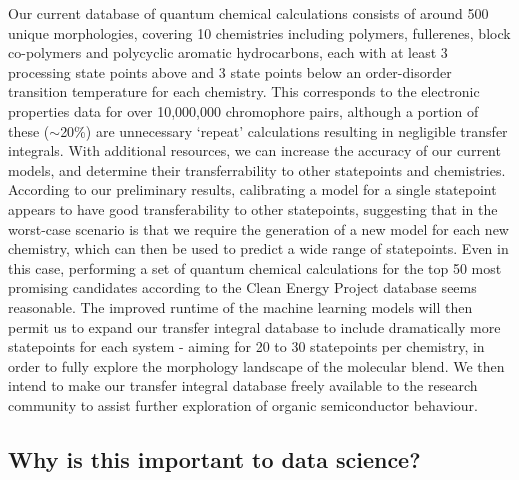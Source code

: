 \documentclass[12pt]{article}
\begin{document}
Our current database of quantum chemical calculations consists of around 500 unique morphologies, covering 10 chemistries including polymers, fullerenes, block co-polymers and polycyclic aromatic hydrocarbons, each with at least 3 processing state points above and 3 state points below an order-disorder transition temperature for each chemistry.
This corresponds to the electronic properties data for over 10,000,000 chromophore pairs, although a portion of these ($\sim$20\%) are unnecessary `repeat' calculations resulting in negligible transfer integrals.
With additional resources, we can increase the accuracy of our current models, and determine their transferrability to other statepoints and chemistries.
According to our preliminary results, calibrating a model for a single statepoint appears to have good transferability to other statepoints, suggesting that in the worst-case scenario is that we require the generation of a new model for each new chemistry, which can then be used to predict a wide range of statepoints.
Even in this case, performing a set of quantum chemical calculations for the top 50 most promising candidates according to the Clean Energy Project database seems reasonable.
The improved runtime of the machine learning models will then permit us to expand our transfer integral database to include dramatically more statepoints for each system - aiming for 20 to 30 statepoints per chemistry, in order to fully explore the morphology landscape of the molecular blend.
We then intend to make our transfer integral database freely available to the research community to assist further exploration of organic semiconductor behaviour.


\subsection{Why is this important to data science?}
\end{document}
